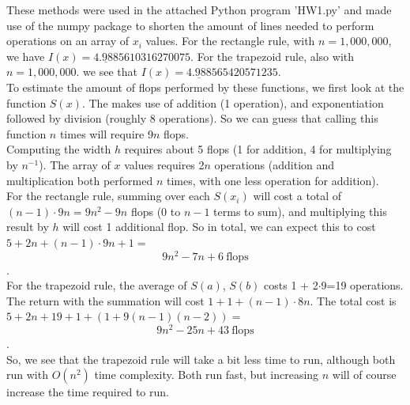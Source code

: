 \documentclass[12pt]{article}
\begin{document}
These methods were used in the attached Python program 'HW1.py' and made use of the numpy package to shorten the amount of lines needed to perform operations on an array of $x_i$ values. For the rectangle rule, with $n = 1,000,000$, we have $I(x) = \underline{4.988}5610316270075$. For the trapezoid rule, also with $n = 1,000,000$. we see that $I(x) = \underline{4.988}565420571235$. 
\\To estimate the amount of flops performed by these functions, we first look at the function $S(x)$. The makes use of addition (1 operation), and exponentiation followed by division (roughly 8 operations). So we can guess that calling this function $n$ times will require 9$n$ flops. 
\\Computing the width $h$ requires about 5 flops (1 for addition, 4 for multiplying by $n^{-1}$). The array of $x$ values requires 2$n$ operations (addition and multiplication both performed $n$ times, with one less operation for addition). 
\\For the rectangle rule, summing over each $S(x_i)$ will cost a total of $(n-1)\cdot9n = 9n^2 - 9n$ flops (0 to $n-1$ terms to sum), and multiplying this result by $h$ will cost 1 additional flop. So in total, we can expect this to cost $5 + 2n + (n-1)\cdot 9n + 1 = $ $$9n^2 -7n + 6 ~\text{flops}$$.
\\For the trapezoid rule, the average of $S(a)$, $S(b)$ costs 1 + 2$\cdot$9=19 operations. The return with the summation will cost $1 + 1 + (n - 1)\cdot8n$. The total cost is $5 + 2n + 19 + 1 + (1 + 9(n-1)(n-2)) = $ $$9n^2 -25n + 43 ~\text{flops}$$.
\\So, we see that the trapezoid rule will take a bit less time to run, although both run with $O(n^2)$ time complexity. Both run fast, but increasing $n$ will of course increase the time required to run.

\newpage
\end{document}
